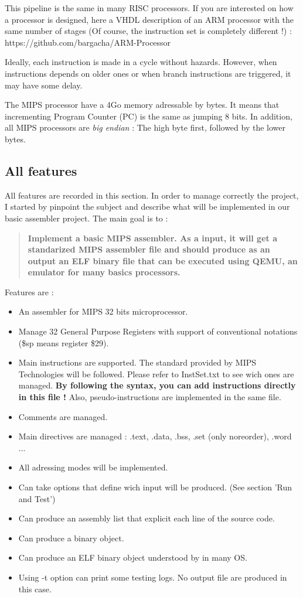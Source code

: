 \documentclass[twoside,twocolumn]{article}
\begin{document}
This pipeline is the same in many RISC processors. If you are interested on how a processor is designed, here a VHDL description of an ARM processor with the same number of stages (Of course, the instruction set is completely different !) : https://github.com/bargacha/ARM-Processor

Ideally, each instruction is made in a cycle without hazards. However, when instructions depends on older ones or when branch instructions are triggered, it may have some delay.

The MIPS processor have a 4Go memory adressable by bytes. It means that incrementing Program Counter (PC) is the same as jumping 8 bits. In addition, all MIPS processors are \textit{big endian} : The high byte first, followed by the lower bytes.

\subsection{All features}

All features are recorded in this section. In order to manage correctly the project, I started by pinpoint the subject and describe what will be implemented in our basic assembler project. The main goal is to :

\begin{quotation}
 \textbf{Implement a basic MIPS assembler. As a input, it will get a standarized MIPS assembler file and should produce as an output an ELF binary file that can be executed using QEMU, an emulator for many basics processors.}
\end{quotation}

Features are :

\begin{itemize}
 \item An assembler for MIPS 32 bits microprocessor.
 \item Manage 32 General Purpose Registers with support of conventional notations (\$sp means register \$29).
 \item Main instructions are supported. The standard provided by MIPS Technologies will be followed. Please refer to InstSet.txt to see wich ones are managed. \textbf{ By following the syntax, you can add instructions directly in this file ! } Also, pseudo-instructions are implemented in the same file.
 \item Comments are managed.
 \item Main directives are managed : .text, .data, .bss, .set (only noreorder), .word ...
 \item All adressing modes will be implemented.
 \item Can take options that define wich input will be produced. (See section 'Run and Test')
 \item Can produce an assembly list that explicit each line of the source code.
 \item Can produce a binary object.
 \item Can produce an ELF binary object understood by in many OS.
 \item Using -t option can print some testing logs. No output file are produced in this case.
\end{itemize}
\end{document}
